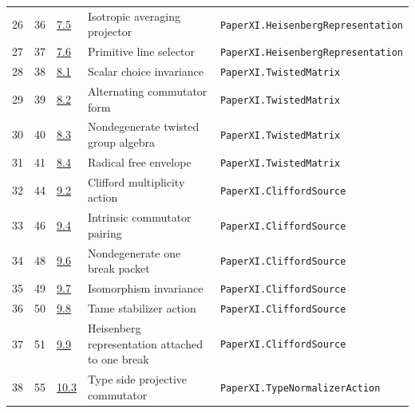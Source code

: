 \documentclass[10pt,oneside]{book}
\begin{document}
\begin{longtable}{@{}p{}p{}p{}>{\raggedright\arraybackslash}p{}p{}@{}}
26&36&\href{https://komorebi.invalid/b07/obligation_26}{7.5}&Isotropic averaging projector&\nolinkurl{PaperXI.HeisenbergRepresentation}\\

27&37&\href{https://komorebi.invalid/b07/obligation_27}{7.6}&Primitive line selector&\nolinkurl{PaperXI.HeisenbergRepresentation}\\

28&38&\href{https://komorebi.invalid/b07/obligation_28}{8.1}&Scalar choice invariance&\nolinkurl{PaperXI.TwistedMatrix}\\

29&39&\href{https://komorebi.invalid/b07/obligation_29}{8.2}&Alternating commutator form&\nolinkurl{PaperXI.TwistedMatrix}\\

30&40&\href{https://komorebi.invalid/b07/obligation_30}{8.3}&Nondegenerate twisted group algebra&\nolinkurl{PaperXI.TwistedMatrix}\\

31&41&\href{https://komorebi.invalid/b07/obligation_31}{8.4}&Radical free envelope&\nolinkurl{PaperXI.TwistedMatrix}\\

32&44&\href{https://komorebi.invalid/b07/obligation_32}{9.2}&Clifford multiplicity action&\nolinkurl{PaperXI.CliffordSource}\\

33&46&\href{https://komorebi.invalid/b07/obligation_33}{9.4}&Intrinsic commutator pairing&\nolinkurl{PaperXI.CliffordSource}\\

34&48&\href{https://komorebi.invalid/b07/obligation_34}{9.6}&Nondegenerate one break packet&\nolinkurl{PaperXI.CliffordSource}\\

35&49&\href{https://komorebi.invalid/b07/obligation_35}{9.7}&Isomorphism invariance&\nolinkurl{PaperXI.CliffordSource}\\

36&50&\href{https://komorebi.invalid/b07/obligation_36}{9.8}&Tame stabilizer action&\nolinkurl{PaperXI.CliffordSource}\\

37&51&\href{https://komorebi.invalid/b07/obligation_37}{9.9}&Heisenberg representation attached to one break&\nolinkurl{PaperXI.CliffordSource}\\

38&55&\href{https://komorebi.invalid/b07/obligation_38}{10.3}&Type side projective commutator&\nolinkurl{PaperXI.TypeNormalizerAction}\\


\end{longtable}
\end{document}
